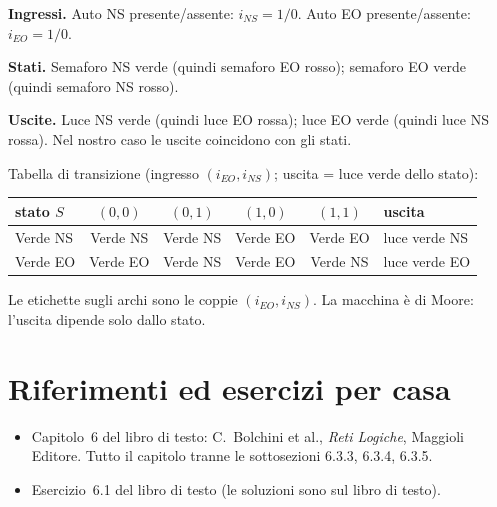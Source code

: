 \documentclass[11pt,a4paper]{article}
\begin{document}
\textbf{Ingressi.} Auto NS presente/assente: $i_{NS} = 1/0$. Auto EO presente/assente: $i_{EO} = 1/0$.

\textbf{Stati.} Semaforo NS verde (quindi semaforo EO rosso); semaforo EO verde (quindi semaforo NS rosso).

\textbf{Uscite.} Luce NS verde (quindi luce EO rossa); luce EO verde (quindi luce NS rossa). Nel nostro caso le uscite coincidono con gli stati.

Tabella di transizione (ingresso $(i_{EO}, i_{NS})$; uscita = luce verde dello stato):
\begin{center}
\begin{tabular}{lccccl}
\toprule
stato $S$ & $(0,0)$ & $(0,1)$ & $(1,0)$ & $(1,1)$ & uscita\\
\midrule
Verde NS & Verde NS & Verde NS & Verde EO & Verde EO & luce verde NS\\
Verde EO & Verde EO & Verde NS & Verde EO & Verde NS & luce verde EO\\
\bottomrule
\end{tabular}
\end{center}

\begin{center}
\end{center}
Le etichette sugli archi sono le coppie $(i_{EO}, i_{NS})$. La macchina è di Moore: l'uscita dipende solo dallo stato.

\section{Riferimenti ed esercizi per casa}

\begin{itemize}
    \item Capitolo~6 del libro di testo: C.~Bolchini et al., \emph{Reti Logiche}, Maggioli Editore. Tutto il capitolo tranne le sottosezioni 6.3.3, 6.3.4, 6.3.5.
    \item Esercizio~6.1 del libro di testo (le soluzioni sono sul libro di testo).
\end{itemize}
\end{document}
